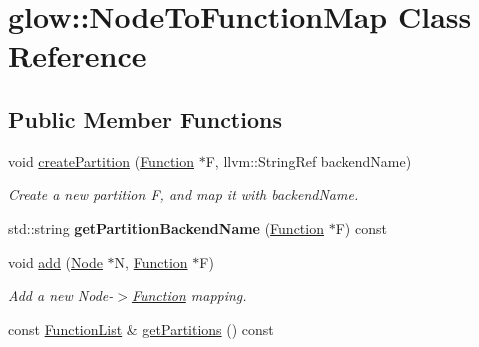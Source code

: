 \hypertarget{classglow_1_1_node_to_function_map}{}\section{glow\+:\+:Node\+To\+Function\+Map Class Reference}
\label{classglow_1_1_node_to_function_map}
\subsection*{Public Member Functions}
\begin{DoxyCompactItemize}
\item 
\mbox{\label{classglow_1_1_node_to_function_map_a4c1bd8fb37aa7ab3fc75189f694061fc}} 
void \hyperlink{classglow_1_1_node_to_function_map_a4c1bd8fb37aa7ab3fc75189f694061fc}{create\+Partition} (\hyperlink{classglow_1_1_function}{Function} $\ast$F, llvm\+::\+String\+Ref backend\+Name)
\begin{DoxyCompactList}\small\item\em Create a new partition {\ttfamily F}, and map it with {\ttfamily backend\+Name}. \end{DoxyCompactList}\item 
\mbox{\label{classglow_1_1_node_to_function_map_ac1f943a133cafdee5122497e28f65616}} 
std\+::string {\bfseries get\+Partition\+Backend\+Name} (\hyperlink{classglow_1_1_function}{Function} $\ast$F) const
\item 
\mbox{\label{classglow_1_1_node_to_function_map_aa8e2424baa1c7decf5a3f76f7c52f12f}} 
void \hyperlink{classglow_1_1_node_to_function_map_aa8e2424baa1c7decf5a3f76f7c52f12f}{add} (\hyperlink{classglow_1_1_node}{Node} $\ast$N, \hyperlink{classglow_1_1_function}{Function} $\ast$F)
\begin{DoxyCompactList}\small\item\em Add a new Node-\/$>$\hyperlink{classglow_1_1_function}{Function} mapping. \end{DoxyCompactList}\item 
\mbox{\label{classglow_1_1_node_to_function_map_af7c28642dbc0a348c13a0770327b836d}} 
const \hyperlink{namespaceglow_ae6f6f350877931e8074457bbab671b5f}{Function\+List} \& \hyperlink{classglow_1_1_node_to_function_map_af7c28642dbc0a348c13a0770327b836d}{get\+Partitions} () const

\end{DoxyCompactItemize}
